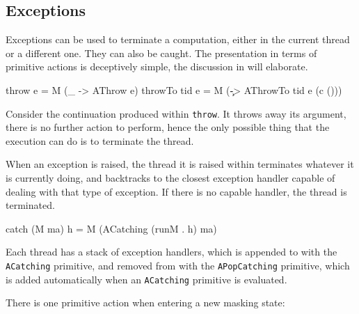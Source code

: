 \subsection{Exceptions}
\label{sec:execution-primops-exceptions}

Exceptions can be used to terminate a computation, either in the
current thread or a different one. They can also be caught. The
presentation in terms of primitive actions is deceptively simple, the
discussion in  will elaborate.

\begin{haskellcode}
throw       e = M (\_ -> AThrow e)
throwTo tid e = M (\c -> AThrowTo tid e (c ()))
\end{haskellcode}


Consider the continuation produced within \verb|throw|. It throws away
its argument, there is no further action to perform, hence the only
possible thing that the execution can do is to terminate the thread.


When an exception is raised, the thread it is raised within terminates
whatever it is currently doing, and backtracks to the closest
exception handler capable of dealing with that type of exception. If
there is no capable handler, the thread is terminated.

\begin{haskellcode}
catch (M ma) h = M (ACatching (runM . h) ma)
\end{haskellcode}


Each thread has a stack of exception handlers, which is appended to
with the \verb|ACatching| primitive, and removed from with the
\verb|APopCatching| primitive, which is added automatically when an
\verb|ACatching| primitive is evaluated.


There is one primitive action when entering a new masking state:


